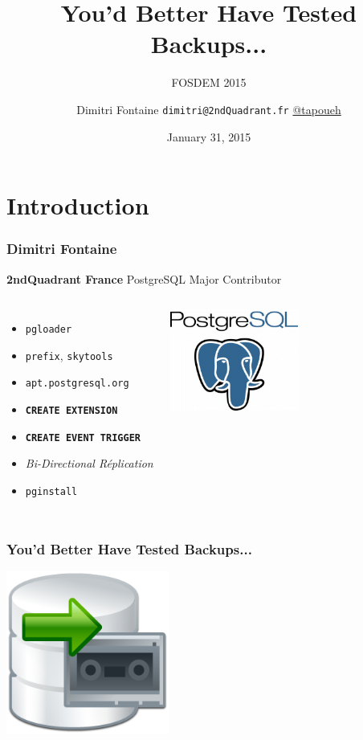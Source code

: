 \documentclass{beamer}
\title{You'd Better Have Tested Backups...}
\subtitle{FOSDEM 2015}
\author{Dimitri Fontaine \texttt{dimitri@2ndQuadrant.fr}
  \linebreak
  \url{@tapoueh}}
\date{January 31, 2015}
\begin{document}
\frame{\titlepage}

\section{Introduction}

\begin{frame}[fragile]
  \frametitle{Dimitri Fontaine}

  \begin{center}
    \textbf{2ndQuadrant France}
    \linebreak
    PostgreSQL Major Contributor
  \end{center}

\begin{columns}[c]

  \begin{itemize}
   \item \texttt{pgloader}
   \item \texttt{prefix}, \texttt{skytools}
   \item \texttt{apt.postgresql.org}
   \item \texttt{\textbf{CREATE EXTENSION}}
   \item \texttt{\textbf{CREATE EVENT TRIGGER}}
   \item \textit{Bi-Directional Réplication}
   \item \texttt{pginstall}
  \end{itemize}  

\begin{center}
  \includegraphics[height=9em]{postgres-logo.png}
\end{center}
\end{columns}
\end{frame}

\begin{frame}
  \frametitle{You'd Better Have Tested Backups...}

  \begin{center}
    \includegraphics[height=2.1in]{backup-review.png}
  \end{center}
\end{frame}
\end{document}
